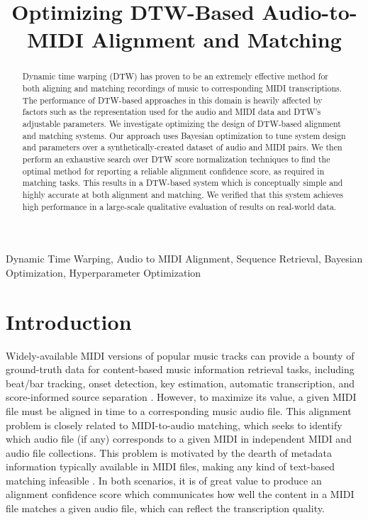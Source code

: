 \documentclass{article}
\title{Optimizing DTW-Based Audio-to-MIDI Alignment and Matching}
\begin{document}
\ninept
\maketitle

\begin{abstract}
Dynamic time warping (DTW) has proven to be an extremely effective method for both aligning and matching recordings of music to corresponding MIDI transcriptions.
The performance of DTW-based approaches in this domain is heavily affected by factors such as the representation used for the audio and MIDI data and DTW's adjustable parameters.
We investigate optimizing the design of DTW-based alignment and matching systems.
Our approach uses Bayesian optimization to tune system design and parameters over a synthetically-created dataset of audio and MIDI pairs.
We then perform an exhaustive search over DTW score normalization techniques to find the optimal method for reporting a reliable alignment confidence score, as required in matching tasks.
This results in a DTW-based system which is conceptually simple and highly accurate at both alignment and matching.
We verified that this system achieves high performance in a large-scale qualitative evaluation of results on real-world data.
\end{abstract}

\begin{keywords}
Dynamic Time Warping, Audio to MIDI Alignment, Sequence Retrieval, Bayesian Optimization, Hyperparameter Optimization
\end{keywords}

\section{Introduction}
\label{sec:intro}

Widely-available MIDI versions of popular music tracks can provide a bounty of ground-truth data for content-based music information retrieval tasks, including beat/bar tracking, onset detection, key estimation, automatic transcription, and score-informed source separation \cite{ewert2012towards, turetsky2003ground, ewert2014score, raffel2014pretty_midi}.
However, to maximize its value, a given MIDI file must be aligned in time to a corresponding music audio file.
This alignment problem is closely related to MIDI-to-audio matching, which seeks to identify which  audio file (if any) corresponds to a given MIDI in independent MIDI and audio file collections.
This problem is motivated by the dearth of metadata information typically available in MIDI files, making any kind of text-based matching infeasible \cite{raffel2015large}.
In both scenarios, it is of great value to produce an alignment confidence score which communicates how well the content in a MIDI file matches a given audio file, which can reflect the transcription quality.
\end{document}

